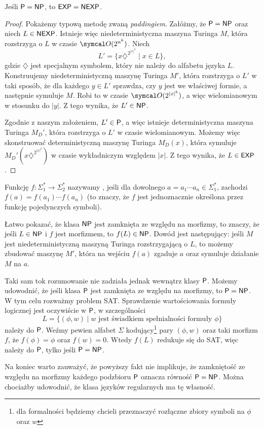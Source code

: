 \begin{theorem}
    Jeśli $\textsf{P} = \textsf{NP}$, to $\textsf{EXP} = \textsf{NEXP}$.
\end{theorem}
\begin{proof}
    Pokażemy typową metodę zwaną \textit{paddingiem}. Załóżmy, że $\textsf{P} = \textsf{NP}$ oraz niech $L \in \textsf{NEXP}$. Istnieje więc niedeterministyczna maszyna Turinga $M$, która rozstrzyga o $L$ w czasie $\sO(2^{n^k})$. Niech
    \[ L' = \{x\diamondsuit^{2^{|x|^k}} \mid x \in L\}, \]
    gdzie $\diamondsuit$ jest specjalnym symbolem, który nie należy do alfabetu języka $L$. Konstruujemy niedeterministyczną maszynę Turinga $M'$, która rozstrzyga o $L'$ w taki sposób, że dla każdego $y \in L'$ sprawdza, czy $y$ jest we właściwej formie, a następnie symuluje $M$. Robi to w czasie $\sO(2^{|x|^k})$, a więc wielomianowym w stosunku do $|y|$. Z tego wynika, że $L' \in \textsf{NP}$.

    Zgodnie z naszym założeniem, $L' \in \textsf{P}$, a więc istnieje deterministyczna maszyna Turinga $M_D'$, która rozstrzyga o $L'$ w czasie wielomianowym. Możemy więc skonstruować deterministyczną maszynę Turinga $M_D(x)$, która symuluje $M_D'(x\diamondsuit^{2^{|x|^k}})$ w czasie wykładniczym względem $|x|$. Z tego wynika, że $L \in \textsf{EXP}$.
\end{proof}

\begin{remark}
    Funkcję $f : \Sigma_1^* \to \Sigma_2^*$ nazywamy , jeśli dla dowolnego $a = a_1 \cdots a_n \in \Sigma_1^*$, zachodzi $f(a) = f(a_1) \cdots f(a_n)$ (to znaczy, że $f$ jest jednoznacznie określona przez funkcję pojedynczych symboli).

    Łatwo pokazać, że klasa $\textsf{NP}$ jest zamknięta ze względu na morfizmy, to znaczy, że jeśli $L \in \textsf{NP}$ i $f$ jest morfizmem, to $f(L) \in \textsf{NP}$. Dowód jest następujący: jeśli $M$ jest niedeterministyczną maszyną Turinga rozstrzygającą o $L$, to możemy zbudować maszynę $M'$, która na wejściu $f(a)$ zgaduje $a$ oraz symuluje działanie $M$ na $a$.

    Taki sam tok rozumowanie nie zadziała jednak wewnątrz klasy $\textsf{P}$. Możemy udowodnić, że jeśli klasa $\textsf{P}$ jest zamknięta ze względu na morfizmy, to $\textsf{P} = \textsf{NP}$.
    W tym celu rozważmy problem SAT. Sprawdzenie wartościowania formuły logicznej jest oczywiście w $\textsf{P}$, w szczególności
    \[ L = \{(\phi, w) \mid w \text{ jest świadkiem spełnialności formuły } \phi \} \]
    należy do $\textsf{P}$. Weźmy pewien alfabet $\Sigma$ kodujący\footnote{dla formalności będziemy chcieli przeznaczyć rozłączne zbiory symboli na $\phi$ oraz $w$} pary $(\phi, w)$ oraz taki morfizm $f$, że $f(\phi) = \phi$ oraz $f(w) = 0$. Wtedy $f(L)$ redukuje się do SAT, więc należy do $\textsf{P}$, tylko jeśli $\textsf{P} = \textsf{NP}$.

    Na koniec warto zauważyć, że powyższy fakt nie implikuje, że zamkniętość ze względu na morfizmy każdego podzbioru $\textsf{P}$ oznacza równość $\textsf{P} = \textsf{NP}$. Można chociażby udowodnić, że klasa języków regularnych ma tę własność.
\end{remark}

